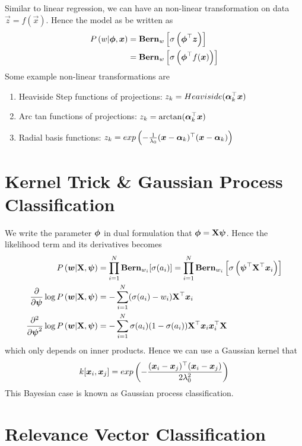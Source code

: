 Similar to linear regression, we can have an non-linear transformation on data $\vec{z}=f(\vec{x})$. Hence the model as be written as
\begin{align*}
	P\left(w|\boldsymbol{\phi},\boldsymbol{x}\right)&=\mathbf{Bern}_w\left[\sigma\left(\boldsymbol{\phi}^\top\boldsymbol{z}\right)\right] \\
	&=\mathbf{Bern}_w\left[\sigma\left(\boldsymbol{\phi}^\top f(\boldsymbol{x})\right)\right]
\end{align*}
Some example non-linear transformations are
\begin{enumerate}
	\item Heaviside Step functions of projections: $z_k=Heaviside(\boldsymbol{\alpha}_k^\top\boldsymbol{x})$
	\item Arc tan functions of projections: $z_k=\arctan(\boldsymbol{\alpha}_k^\top\boldsymbol{x})$
	\item Radial basis functions: $z_k=exp\left(-\frac{1}{\lambda_0}(\boldsymbol{x}-\boldsymbol{\alpha}_k){}^\top(\boldsymbol{x}-\boldsymbol{\alpha}_k)\right)$
\end{enumerate}



\section{Kernel Trick \& Gaussian Process Classification}
\label{section7.4}

We write the parameter $\boldsymbol{\phi}$ in dual formulation that $\boldsymbol{\phi}=\mathbf{X}\boldsymbol{\psi}$. Hence the likelihood term and its derivatives becomes
\begin{align*}
	P\left(\boldsymbol{w}|\mathbf{X},\boldsymbol{\psi}\right)&=\prod_{i=1}^N\mathbf{Bern}_{w_i}[\sigma(a_i)]=\prod_{i=1}^N\mathbf{Bern}_{w_i}\left[\sigma\left(\boldsymbol{\psi}^\top\mathbf{X}^\top\boldsymbol{x}_i\right)\right] \\
	\frac{\partial}{\partial\boldsymbol{\psi}}\log P\left(\boldsymbol{w}|\mathbf{X},\boldsymbol{\psi}\right)&=-\sum_{i=1}^N(\sigma(a_i)-w_i)\mathbf{X}^\top\boldsymbol{x}_i \\
	\frac{\partial^2}{\partial\boldsymbol{\psi}^2}\log P\left(\boldsymbol{w}|\mathbf{X},\boldsymbol{\psi}\right)&=-\sum_{i=1}^N\sigma(a_i)(1-\sigma(a_i))\mathbf{X}^\top\boldsymbol{x}_i\boldsymbol{x}_i^\top\mathbf{X}
\end{align*}
which only depends on inner products. Hence we can use a Gaussian kernel that
\begin{align*}
	k[\boldsymbol{x}_i,\boldsymbol{x}_j]=exp\left(-\frac{(\boldsymbol{x}_i-\boldsymbol{x}_j){}^\top(\boldsymbol{x}_i-\boldsymbol{x}_j)}{2\lambda_0^2}\right)
\end{align*}
This Bayesian case is known as Gaussian process classification.



\section{Relevance Vector Classification}
\label{section7.5}

